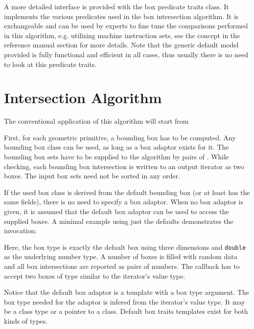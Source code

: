 \begin{ccAdvanced}
  A more detailed interface is provided with the box predicate traits
  class. It implements the various predicates used in the box
  intersection algorithm. It is exchangeable and can be used by
  experts to fine tune the comparisons performed in this algorithm,
  e.g. utilizing machine instruction sets, see the
   concept in the reference manual section
  for more details. Note that the generic default model provided is
  fully functional and efficient in all cases, thus usually there is
  no need to look at this predicate traits. 
\end{ccAdvanced}



\section{Intersection Algorithm}

The conventional application of this algorithm will start from 

First, for each geometric primitive, a bounding box has to be
computed. Any bounding box class can be used, as long as a box adaptor
exists for it. The bounding box sets have to be supplied to the
algorithm by pairs of . While checking,
each bounding box intersection is written to an output iterator as two
boxes. The input box sets need not be sorted in any order.

If the used box class is derived from the default bounding box (or at
least has the same fields), there is no need to specify a box adaptor.
When no box adaptor is given, it is assumed that the default box
adaptor can be used to access the supplied boxes. A minimal example
using just the defaults demonstrates the invocation:


Here, the box type is exactly the default box using three dimensions
and \texttt{double} as the underlying number type. A number of boxes
is filled with random data and all box intersections are reported as
pairs of numbers. The callback has to accept two boxes of type similar
to the iterator's value type.

Notice that the default box adaptor is a template with a box type
argument. The box type needed for the adaptor is infered from the
iterator's value type. It may be a class type or a pointer to a class.
Default box traits templates exist for both kinds of types.

